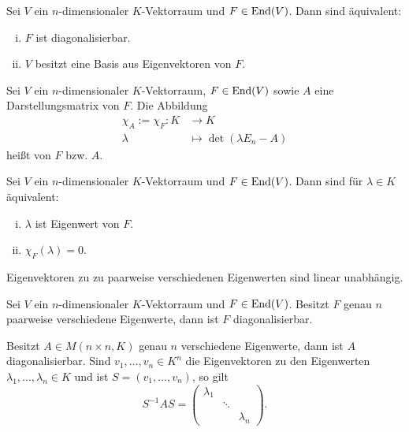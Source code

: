 \setcounter{definition}{8}
\begin{satz}
	\label{satz:I.16.9}
	Sei $V$ ein $n$-dimensionaler $K$-Vektorraum und $F \in \operatorname{End}(V)$.
	Dann sind äquivalent:
	\begin{enumerate}[(i)]
		\item $F$ ist diagonalisierbar.
		\item $V$ besitzt eine Basis aus Eigenvektoren von $F$.
	\end{enumerate}
\end{satz}
\newpage
\setcounter{definition}{10}
\begin{definition}
	\label{def:I.16.11}
	Sei $V$ ein $n$-dimensionaler $K$-Vektorraum, $F \in \operatorname{End}(V)$ sowie $A$ eine Darstellungsmatrix von $F$.
	Die Abbildung
	\begin{align*}
		\chi_A := \chi_F \colon K &\longrightarrow K \\
		\lambda &\longmapsto \det(\lambda E_n - A)
	\end{align*}
	heißt  von $F$ bzw. $A$.
\end{definition}

\begin{satz}
	\label{satz:I.16.12}
	Sei $V$ ein $n$-dimensionaler $K$-Vektorraum und $F \in \operatorname{End}(V)$.
	Dann sind für $\lambda \in K$ äquivalent:
	\begin{enumerate}[(i)]
		\item $\lambda$ ist Eigenwert von $F$.
		\item $\chi_F(\lambda) = 0$.
	\end{enumerate}
\end{satz}

\setcounter{definition}{13}
\begin{lemma}
	\label{def:I.16.14}
	Eigenvektoren zu zu paarweise verschiedenen Eigenwerten sind linear unabhängig.
\end{lemma}

\begin{satz}
	\label{satz:I.16.15}
	Sei $V$ ein $n$-dimensionaler $K$-Vektorraum und $F \in \operatorname{End}(V)$.
	Besitzt $F$ genau $n$ paarweise verschiedene Eigenwerte, dann ist $F$ diagonalisierbar.
\end{satz}

\begin{satz}
	\label{satz:I.16.16}
	Besitzt $A \in M(n \times n,K)$ genau $n$ verschiedene Eigenwerte, dann ist $A$ diagonalisierbar.
	Sind $v_1,\dots,v_n \in K^n$ die Eigenvektoren zu den Eigenwerten $\lambda_1,\dots,\lambda_n \in K$ und ist $S = (v_1,\dots,v_n)$, so gilt
	\[
		S^{-1}AS = \begin{pmatrix}
		\lambda_1 &  &  \\ 
		& \ddots &  \\ 
		&  & \lambda_n
		\end{pmatrix}.
	\]
\end{satz}

